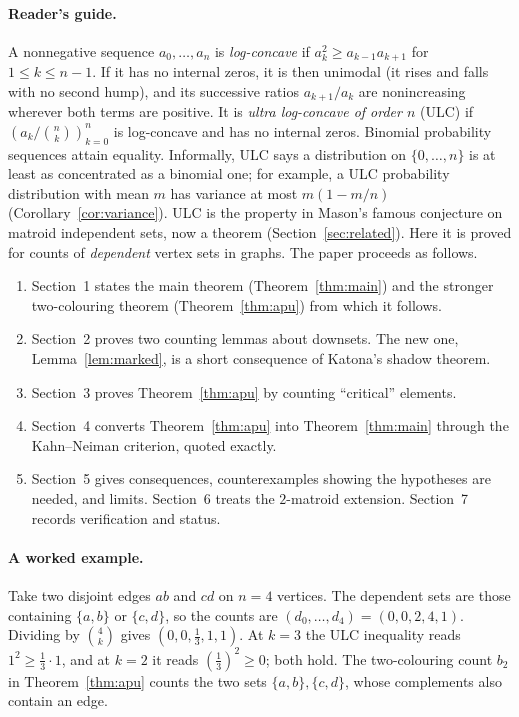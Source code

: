 \documentclass[11pt,a4paper]{article}
\theoremstyle{remark}
\begin{document}
\paragraph{Reader's guide.} A nonnegative sequence $a_0,\dots,a_n$ is \emph{log-concave} if $a_k^2\ge a_{k-1}a_{k+1}$ for $1\le k\le n-1$. If it has no internal zeros, it is then unimodal (it rises and falls with no second hump), and its successive ratios $a_{k+1}/a_k$ are nonincreasing wherever both terms are positive. It is \emph{ultra log-concave of order $n$} (ULC) if $(a_k/\binom nk)_{k=0}^n$ is log-concave and has no internal zeros. Binomial probability sequences attain equality. Informally, ULC says a distribution on $\{0,\dots,n\}$ is at least as concentrated as a binomial one; for example, a ULC probability distribution with mean $m$ has variance at most $m(1-m/n)$ (Corollary~\ref{cor:variance}). ULC is the property in Mason's famous conjecture on matroid independent sets, now a theorem (Section~\ref{sec:related}). Here it is proved for counts of \emph{dependent} vertex sets in graphs. The paper proceeds as follows.
\begin{enumerate}
\item Section~1 states the main theorem (Theorem~\ref{thm:main}) and the stronger two-colouring theorem (Theorem~\ref{thm:apu}) from which it follows.
\item Section~2 proves two counting lemmas about downsets. The new one, Lemma~\ref{lem:marked}, is a short consequence of Katona's shadow theorem.
\item Section~3 proves Theorem~\ref{thm:apu} by counting ``critical'' elements.
\item Section~4 converts Theorem~\ref{thm:apu} into Theorem~\ref{thm:main} through the Kahn--Neiman criterion, quoted exactly.
\item Section~5 gives consequences, counterexamples showing the hypotheses are needed, and limits. Section~6 treats the $2$-matroid extension. Section~7 records verification and status.
\end{enumerate}

\paragraph{A worked example.} Take two disjoint edges $ab$ and $cd$ on $n=4$ vertices. The dependent sets are those containing $\{a,b\}$ or $\{c,d\}$, so the counts are $(d_0,\dots,d_4)=(0,0,2,4,1)$. Dividing by $\binom4k$ gives $(0,0,\tfrac13,1,1)$. At $k=3$ the ULC inequality reads $1^2\ge\tfrac13\cdot1$, and at $k=2$ it reads $(\tfrac13)^2\ge0$; both hold. The two-colouring count $b_2$ in Theorem~\ref{thm:apu} counts the two sets $\{a,b\},\{c,d\}$, whose complements also contain an edge.
\end{document}

